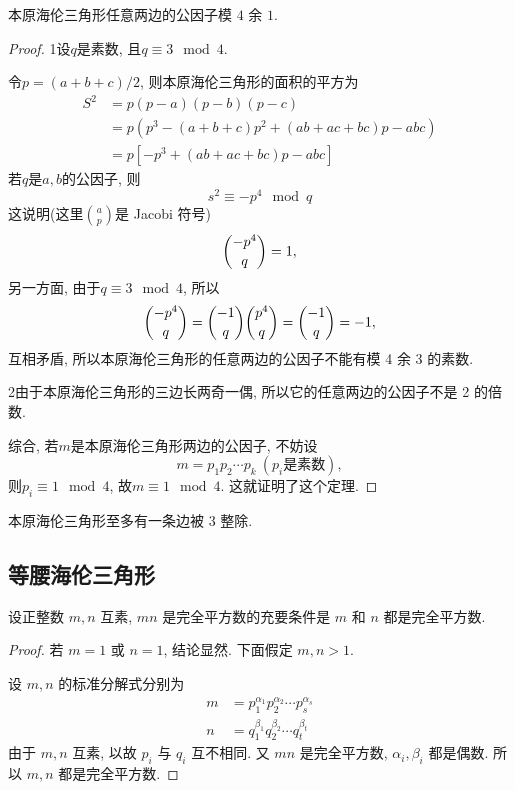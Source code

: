 \documentclass[12pt]{article}
\begin{document}
\begin{theorem}
    本原海伦三角形任意两边的公因子模 $4$ 余 $1$. 
\end{theorem}
\begin{proof}
    \circled1设$q$是素数, 且$q\equiv3\mod4$.\par
    令$p=(a+b+c)/2$, 则本原海伦三角形的面积的平方为
    \begin{align*}
        S^2&=p(p-a)(p-b)(p-c)\\
        &=p(p^3-(a+b+c)p^2+(ab+ac+bc)p-abc)\\
        &=p[-p^3+(ab+ac+bc)p-abc]
    \end{align*}
    若$q$是$a,b$的公因子, 则
    \[s^2\equiv-p^4\mod q\]
    这说明(这里$\binom ap$是 Jacobi 符号)
    \[\dbinom{-p^4}{q}=1, \]
    另一方面, 由于$q\equiv3\mod4$, 所以
    \[\dbinom{-p^4}{q}=\dbinom{-1}{q}\dbinom{p^4}{q}=\dbinom{-1}{q}=-1,\]
    互相矛盾, 所以本原海伦三角形的任意两边的公因子不能有模 4 余 3 的素数. \par
    \circled2由于本原海伦三角形的三边长两奇一偶, 所以它的任意两边的公因子不是 2 的倍数. \par
    综合, 若$m$是本原海伦三角形两边的公因子, 不妨设
     \[m=p_1p_2\cdots p_k\ (p_i\text{是素数}),\]
    则$p_i\equiv1\mod4$, 故$m\equiv1\mod4$.
    这就证明了这个定理. 
\end{proof}

\begin{corollary}
    本原海伦三角形至多有一条边被 3 整除. 
\end{corollary}

    
\subsection{等腰海伦三角形}
\begin{lemma}
    设正整数 $m,n$ 互素, $mn$ 是完全平方数的充要条件是 $m$ 和 $n$ 都是完全平方数. 
\end{lemma}
\begin{proof}
    若 $m=1$ 或 $n=1$, 结论显然. 下面假定 $m,n>1$.\par
    设 $m,n$ 的标准分解式分别为
    \begin{align*}
        m &= p_1^{\alpha_1}p_2^{\alpha_2}\cdots p_s^{\alpha_s} \\
        n &= q_1^{\beta_1}q_2^{\beta_2}\cdots q_t^{\beta_t}
    \end{align*}
    由于 $m,n$ 互素, 以故 $p_i$ 与 $q_i$ 互不相同. 又 $mn$ 是完全平方数, $\alpha_i, \beta_i$ 都是偶数. 所以 $m,n$ 都是完全平方数. 
\end{proof}
\end{document}
